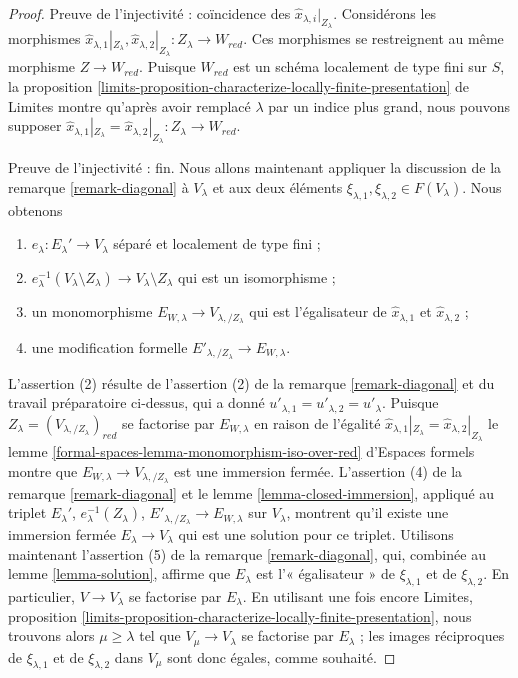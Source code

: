 \begin{proof}
\medskip\noindent
Preuve de l'injectivité : coïncidence des
$\hat x_{\lambda, i}|_{Z_\lambda}$.
Considérons les morphismes
$\hat x_{\lambda, 1}|_{Z_\lambda}, \hat x_{\lambda, 2}|_{Z_\lambda} :
Z_\lambda \to W_{red}$.
Ces morphismes se restreignent au même morphisme $Z \to W_{red}$. Puisque
$W_{red}$ est un schéma localement de type fini sur $S$, la proposition
\ref{limits-proposition-characterize-locally-finite-presentation} de Limites
montre qu'après avoir remplacé $\lambda$ par un indice plus grand, nous pouvons
supposer
$\hat x_{\lambda, 1}|_{Z_\lambda} = \hat x_{\lambda, 2}|_{Z_\lambda} :
Z_\lambda \to W_{red}$.

\medskip\noindent
Preuve de l'injectivité : fin.
Nous allons maintenant appliquer la discussion de la remarque
\ref{remark-diagonal} à $V_\lambda$ et aux deux éléments
$\xi_{\lambda, 1}, \xi_{\lambda, 2} \in F(V_\lambda)$. Nous obtenons
\begin{enumerate}
\item $e_\lambda : E_\lambda' \to V_\lambda$
séparé et localement de type fini ;
\item $e_\lambda^{-1}(V_\lambda \setminus Z_\lambda) \to
V_\lambda \setminus Z_\lambda$ qui est un isomorphisme ;
\item un monomorphisme $E_{W, \lambda} \to V_{\lambda, /Z_\lambda}$ qui est
l'égalisateur de $\hat x_{\lambda, 1}$ et $\hat x_{\lambda, 2}$ ;
\item une modification formelle
$E'_{\lambda, /Z_\lambda} \to E_{W, \lambda}$.
\end{enumerate}
L'assertion (2) résulte de l'assertion (2) de la remarque
\ref{remark-diagonal} et du travail préparatoire ci-dessus, qui a donné
$u'_{\lambda, 1} = u'_{\lambda, 2} = u'_\lambda$.
Puisque $Z_\lambda = (V_{\lambda, /Z_\lambda})_{red}$ se factorise par
$E_{W, \lambda}$ en raison de l'égalité
$\hat x_{\lambda, 1}|_{Z_\lambda} = \hat x_{\lambda, 2}|_{Z_\lambda}$
le lemme \ref{formal-spaces-lemma-monomorphism-iso-over-red} d'Espaces formels
montre que $E_{W, \lambda} \to V_{\lambda, /Z_\lambda}$ est une immersion
fermée. L'assertion (4) de la remarque \ref{remark-diagonal} et le lemme
\ref{lemma-closed-immersion}, appliqué au triplet
$E_\lambda'$, $e_\lambda^{-1}(Z_\lambda)$,
$E'_{\lambda, /Z_\lambda} \to E_{W, \lambda}$ sur $V_\lambda$, montrent qu'il
existe une immersion fermée $E_\lambda \to V_\lambda$ qui est une solution
pour ce triplet. Utilisons maintenant l'assertion (5) de la remarque
\ref{remark-diagonal}, qui, combinée au lemme \ref{lemma-solution}, affirme que
$E_\lambda$ est l'« égalisateur » de $\xi_{\lambda, 1}$ et de
$\xi_{\lambda, 2}$. En particulier, $V \to V_\lambda$ se factorise par
$E_\lambda$. En utilisant une fois encore Limites, proposition
\ref{limits-proposition-characterize-locally-finite-presentation}, nous
trouvons alors $\mu \geq \lambda$ tel que $V_\mu \to V_\lambda$ se factorise
par $E_\lambda$ ; les images réciproques de $\xi_{\lambda, 1}$ et de
$\xi_{\lambda, 2}$ dans $V_\mu$ sont donc égales, comme souhaité.


\end{proof}
